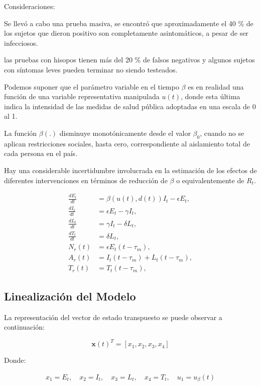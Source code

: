 \documentclass[journal]{IEEEtran}
\begin{document}
Consideraciones:

Se llevó a cabo una prueba masiva, se encontró que aproximadamente el 40 \% de los sujetos que dieron positivo son completamente asintomáticos, a pesar de ser infecciosos.

 las pruebas con hisopos tienen más del 20 \% de falsos negativos y algunos sujetos con síntomas leves pueden terminar no siendo testeados.

Podemos suponer que el parámetro variable en el tiempo $\beta$ es en realidad una función de una variable representativa manipulada $u(t)$, donde esta última indica la intensidad de las medidas de salud pública adoptadas en una escala de 0 al 1.


La función $\beta(.)$ disminuye monotónicamente desde el valor $\beta_0$, cuando no se aplican restricciones sociales, hasta cero, correspondiente al aislamiento total de cada persona en el país.


Hay una considerable incertidumbre involucrada en la estimación de los efectos de diferentes intervenciones en términos de reducción de $\beta$ o equivalentemente de $R_t$.



\begin{align}
    \frac{dE_t}{dt} &= \beta(u(t), d(t))I_t - \epsilon E_t, \\[10pt]
    \frac{dI_t}{dt} &= \epsilon E_t - \gamma I_t,  \\[10pt]
    \frac{dL_t}{dt} &= \gamma I_t - \delta L_t, \\[10pt]
    \frac{dT_t}{dt} &= \delta L_t, \\[10pt]
    N_r(t) &= \epsilon E_t(t - \tau_m), \\[10pt]
    A_r(t) &= I_t(t - \tau_m) + L_t(t - \tau_m), \\[10pt]
    T_r(t) &= T_t(t - \tau_m), 
\end{align}

\subsection{Linealización del Modelo}
La representación del vector de estado transpuesto se puede observar a continuación:

$$
\mathbf{x}(t)^T = [x_1, x_2, x_3, x_4]
$$

Donde:


\begin{align*}
x_1 = E_t, \quad
x_2 = I_t, \quad
x_3 = L_t, \quad
x_4 = T_t, \quad
u_1 = u_{\beta}(t)
\end{align*}
\end{document}

